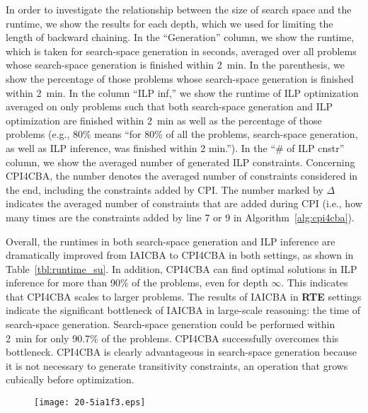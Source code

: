 \documentclass[english]{jnlp_1.4}
\begin{document}
In order to investigate the relationship between the size
of search space and the runtime, we show the results for each depth,
which we used for limiting the length of backward chaining. In the
``Generation'' column, we show the runtime, which is taken for
search-space generation in seconds, averaged over all problems whose
search-space generation is finished within 2~min. In the
parenthesis, we show the percentage of those problems whose
search-space generation is finished within 2~min. In the column
``ILP inf,'' we show the runtime of ILP optimization averaged on only
problems such that both search-space generation and ILP optimization
are finished within 2~min as well as the percentage of those
problems (e.g., 80\% means ``for 80\% of all the problems,
search-space generation, as well as ILP inference, was finished within 2
min.''). In the ``\# of ILP cnstr'' column, we show the averaged
number of generated ILP constraints. Concerning CPI4CBA, the number
denotes the averaged number of constraints considered in the end,
including the constraints added by CPI. The number marked by $\Delta$
indicates the averaged number of constraints that are added during CPI
(i.e., how many times are the constraints added by line 7 or 9 in
Algorithm~\ref{alg:cpi4cba}).


Overall, the runtimes in both search-space generation and ILP inference are
dramatically improved from IAICBA to CPI4CBA in both settings, 
as shown in Table~\ref{tbl:runtime_su}. In addition, CPI4CBA can find optimal solutions in ILP
inference for more than 90\% of the problems, even for depth $\infty$. This
indicates that CPI4CBA scales to larger problems. The results of IAICBA in
\textbf{RTE} settings indicate the significant bottleneck of IAICBA in
large-scale reasoning: the time of search-space generation. Search-space
generation could be performed within 2~min for only 90.7\% of the problems.
CPI4CBA successfully overcomes this bottleneck. CPI4CBA is clearly advantageous
in search-space generation because it is not necessary to generate
transitivity constraints, an operation that grows cubically before optimization.

\begin{figure}[b]
  \begin{center}
\texttt{[image: 20-5ia1f3.eps]}
  \end{center}
    \label{fig:scale_su}
\end{figure}
\end{document}
